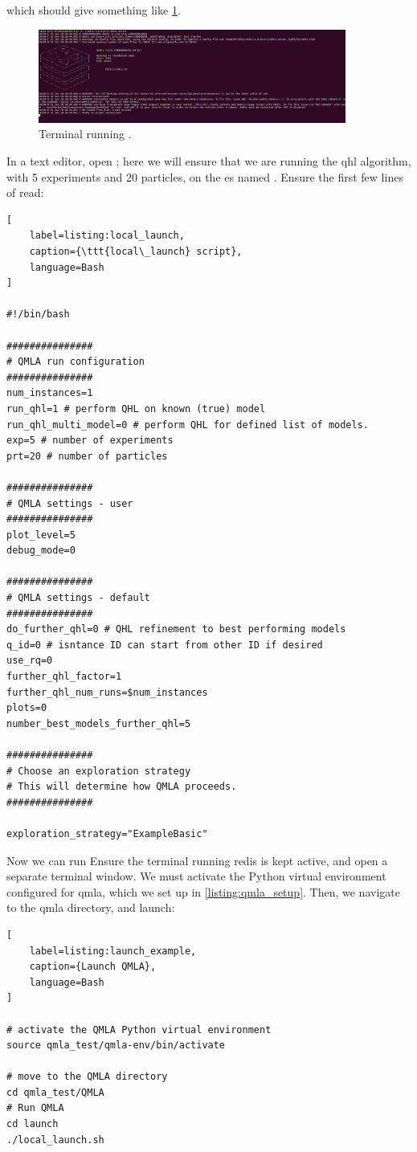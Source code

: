 which should give something like \cref{fig:terminal_redis}.
\begin{figure}[h!]
    \begin{center}
        \includegraphics[width=0.9\textwidth]{appendix/figures/terminal_redis.png}
    \end{center}
    \caption[Terminal running redis-server]{Terminal running .}
    \label{fig:terminal_redis}
\end{figure}
\par 

In a text editor, open ; 
    here we will ensure that we are running the \gls{qhl} algorithm, 
    with 5 experiments and 20 particles, on the \gls{es} named .
Ensure the first few lines of  read:

\begin{lstlisting}[
    label=listing:local_launch,
    caption={\ttt{local\_launch} script},
    language=Bash
]
    
#!/bin/bash

###############
# QMLA run configuration
###############
num_instances=1
run_qhl=1 # perform QHL on known (true) model
run_qhl_multi_model=0 # perform QHL for defined list of models.
exp=5 # number of experiments
prt=20 # number of particles

###############
# QMLA settings - user
###############
plot_level=5
debug_mode=0

###############
# QMLA settings - default
###############
do_further_qhl=0 # QHL refinement to best performing models 
q_id=0 # isntance ID can start from other ID if desired
use_rq=0
further_qhl_factor=1
further_qhl_num_runs=$num_instances
plots=0
number_best_models_further_qhl=5

###############
# Choose an exploration strategy 
# This will determine how QMLA proceeds. 
###############

exploration_strategy="ExampleBasic"
\end{lstlisting}    

Now we can run 
Ensure the terminal running redis is kept active, and open a separate terminal window. 
We must activate the Python virtual environment configured for \gls{qmla}, 
which we set up in \cref{listing:qmla_setup}. 
Then, we navigate to the \gls{qmla} directory, and launch:
\begin{lstlisting}[
    label=listing:launch_example,
    caption={Launch QMLA},
    language=Bash
]

# activate the QMLA Python virtual environment 
source qmla_test/qmla-env/bin/activate

# move to the QMLA directory 
cd qmla_test/QMLA
# Run QMLA
cd launch   
./local_launch.sh

\end{lstlisting}

